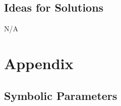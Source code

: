 \documentclass[12pt, titlepage]{article}
\begin{document}
\subsection{Ideas for Solutions}
N/A





\newpage

\section{Appendix}

\subsection{Symbolic Parameters}
\end{document}

